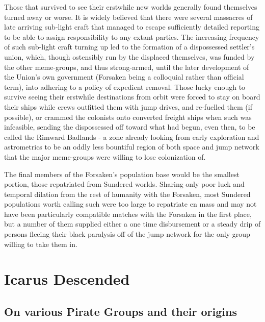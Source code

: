 Those that survived to see their erstwhile new worlds generally found
themselves turned away or worse. It is widely believed that there were
several massacres of late arriving sub-light craft that managed to
escape sufficiently detailed reporting to be able to assign
responsibility to any extant parties. The increasing frequency of such
sub-light craft turning up led to the formation of a dispossessed
settler's union, which, though ostensibly run by the displaced
themselves, was funded by the other meme-groups, and thus
strong-armed, until the later development of the Union's own
government (Forsaken being a colloquial rather than official term),
into adhering to a policy of expedient removal. Those lucky enough to
survive seeing their erstwhile destinations from orbit were forced to
stay on board their ships while crews outfitted them with jump drives,
and re-fuelled them (if possible), or crammed the colonists onto
converted freight ships when such was infeasible, sending the
dispossessed off toward what had begun, even then, to be called the
Rimward Badlands - a zone already looking from early exploration and
astrometrics to be an oddly less bountiful region of both space and
jump network that the major meme-groups were willing to lose
colonization of.

The final members of the Forsaken's population base would be the
smallest portion, those repatriated from Sundered worlds. Sharing only
poor luck and temporal dilation from the rest of humanity with the
Forsaken, most Sundered populations worth calling such were too large
to repatriate en mass and may not have been particularly compatible
matches with the Forsaken in the first place, but a number of them
supplied either a one time disbursement or a steady drip of persons
fleeing their black paralysis off of the jump network for the only
group willing to take them in.
 
\section{Icarus Descended}
\subsection{On various Pirate Groups and their origins }

